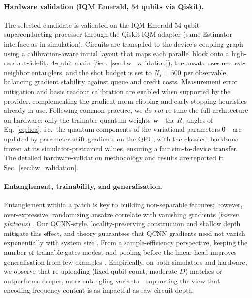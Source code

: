 \paragraph{Hardware validation (IQM Emerald, 54 qubits via Qiskit).}
The selected candidate is validated on the IQM Emerald 54-qubit superconducting processor through the Qiskit-IQM adapter (same Estimator interface as in simulation). Circuits are transpiled to the device's coupling graph using a calibration-aware initial layout that maps each parallel block onto a high-readout-fidelity 4-qubit chain (Sec.~\ref{sec:hw_validation}); the ansatz uses nearest-neighbor entanglers, and the shot budget is set to $N_s=500$ per observable, balancing gradient stability against queue and credit costs. Measurement error mitigation and basic readout calibration are enabled when supported by the provider, complementing the gradient-norm clipping and early-stopping heuristics already in use. Following common practice, we \emph{do not} re-tune the full architecture on hardware: only the trainable quantum weights $\boldsymbol{w}$---the $R_z$ angles of Eq.~\ref{eq:hea}, i.e.\ the quantum components of the variational parameters $\boldsymbol{\theta}$---are updated by parameter-shift gradients on the QPU, with the classical backbone frozen at its simulator-pretrained values, ensuring a fair sim-to-device transfer. The detailed hardware-validation methodology and results are reported in Sec.~\ref{sec:hw_validation}.

\paragraph{Entanglement, trainability, and generalisation.}
Entanglement within a patch is key to building non-separable features; however, over-expressive, randomizing ansätze correlate with vanishing gradients (\emph{barren plateaus}) \cite{McClean2018,Holmes2022PRXQ,Marrero2021PRXQ}. Our QCNN-style, locality-preserving construction and shallow depth mitigate this effect, and theory guarantees that QCNN gradients need not vanish exponentially with system size \cite{Pesah2021PRX}. From a sample-efficiency perspective, keeping the number of trainable gates modest and pooling before the linear head improves generalisation from few examples \cite{Caro2022NatCommun}. Empirically, on both simulators and hardware, we observe that re-uploading (fixed qubit count, moderate $D$) matches or outperforms deeper, more entangling variants—supporting the view that encoding frequency content is as impactful as raw circuit depth.

